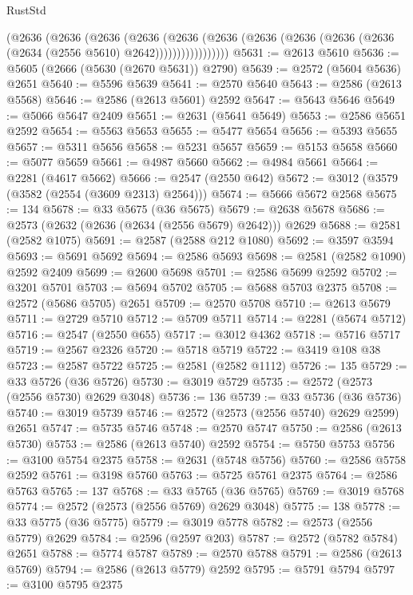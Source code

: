 \begin{lexlean}{RustStd}
\begin{coremodule}
                (@2636
                  (@2636
                    (@2636
                      (@2636
                        (@2636
                          (@2636
                            (@2636 (@2636 (@2636 (@2636 (@2634 (@2556 @5610) @2642)))))))))))))))))
@5631 := @2613 @5610
@5636 := @5605 (@2666 (@5630 (@2670 @5631)) @2790)
@5639 := @2572 (@5604 @5636) @2651
@5640 := @5596 @5639
@5641 := @2570 @5640
@5643 := @2586 (@2613 @5568)
@5646 := @2586 (@2613 @5601) @2592
@5647 := @5643 @5646
@5649 := @5066 @5647 @2409
@5651 := @2631 (@5641 @5649)
@5653 := @2586 @5651 @2592
@5654 := @5563 @5653
@5655 := @5477 @5654
@5656 := @5393 @5655
@5657 := @5311 @5656
@5658 := @5231 @5657
@5659 := @5153 @5658
@5660 := @5077 @5659
@5661 := @4987 @5660
@5662 := @4984 @5661
@5664 := @2281 (@4617 @5662)
@5666 := @2547 (@2550 @642)
@5672 := @3012 (@3579 (@3582 (@2554 (@3609 @2313) @2564)))
@5674 := @5666 @5672 @2568
@5675 := 134
@5678 := @33 @5675 (@36 @5675)
@5679 := @2638 @5678
@5686 := @2573 (@2632 (@2636 (@2634 (@2556 @5679) @2642))) @2629
@5688 := @2581 (@2582 @1075)
@5691 := @2587 (@2588 @212 @1080)
@5692 := @3597 @3594
@5693 := @5691 @5692
@5694 := @2586 @5693
@5698 := @2581 (@2582 @1090) @2592 @2409
@5699 := @2600 @5698
@5701 := @2586 @5699 @2592
@5702 := @3201 @5701
@5703 := @5694 @5702
@5705 := @5688 @5703 @2375
@5708 := @2572 (@5686 @5705) @2651
@5709 := @2570 @5708
@5710 := @2613 @5679
@5711 := @2729 @5710
@5712 := @5709 @5711
@5714 := @2281 (@5674 @5712)
@5716 := @2547 (@2550 @655)
@5717 := @3012 @4362
@5718 := @5716 @5717
@5719 := @2567 @2326
@5720 := @5718 @5719
@5722 := @3419 @108 @38
@5723 := @2587 @5722
@5725 := @2581 (@2582 @1112)
@5726 := 135
@5729 := @33 @5726 (@36 @5726)
@5730 := @3019 @5729
@5735 := @2572 (@2573 (@2556 @5730) @2629 @3048)
@5736 := 136
@5739 := @33 @5736 (@36 @5736)
@5740 := @3019 @5739
@5746 := @2572 (@2573 (@2556 @5740) @2629 @2599) @2651
@5747 := @5735 @5746
@5748 := @2570 @5747
@5750 := @2586 (@2613 @5730)
@5753 := @2586 (@2613 @5740) @2592
@5754 := @5750 @5753
@5756 := @3100 @5754 @2375
@5758 := @2631 (@5748 @5756)
@5760 := @2586 @5758 @2592
@5761 := @3198 @5760
@5763 := @5725 @5761 @2375
@5764 := @2586 @5763
@5765 := 137
@5768 := @33 @5765 (@36 @5765)
@5769 := @3019 @5768
@5774 := @2572 (@2573 (@2556 @5769) @2629 @3048)
@5775 := 138
@5778 := @33 @5775 (@36 @5775)
@5779 := @3019 @5778
@5782 := @2573 (@2556 @5779) @2629
@5784 := @2596 (@2597 @203)
@5787 := @2572 (@5782 @5784) @2651
@5788 := @5774 @5787
@5789 := @2570 @5788
@5791 := @2586 (@2613 @5769)
@5794 := @2586 (@2613 @5779) @2592
@5795 := @5791 @5794
@5797 := @3100 @5795 @2375

\end{coremodule}
\end{lexlean}
